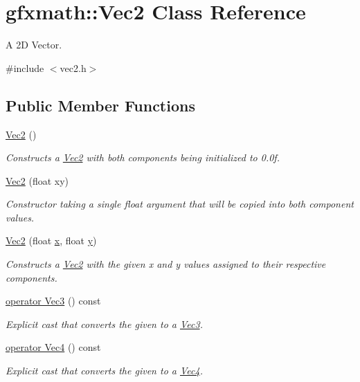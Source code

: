 \hypertarget{classgfxmath_1_1_vec2}{}\section{gfxmath\+:\+:Vec2 Class Reference}
\label{classgfxmath_1_1_vec2}


A 2\+D Vector.  




{\ttfamily \#include $<$vec2.\+h$>$}

\subsection*{Public Member Functions}
\begin{DoxyCompactItemize}
\item 
\hyperlink{classgfxmath_1_1_vec2_a6705094ec1164c6a52c1bbe9d94d9192}{Vec2} ()
\begin{DoxyCompactList}\small\item\em Constructs a \hyperlink{classgfxmath_1_1_vec2}{Vec2} with both components being initialized to 0.\+0f. \end{DoxyCompactList}\item 
\hyperlink{classgfxmath_1_1_vec2_ae02f434b2c19a96b3a4de04ab40d1926}{Vec2} (float xy)
\begin{DoxyCompactList}\small\item\em Constructor taking a single float argument that will be copied into both component values. \end{DoxyCompactList}\item 
\hyperlink{classgfxmath_1_1_vec2_a5d6593c89cfc3f5f0d0d11335363a50b}{Vec2} (float \hyperlink{classgfxmath_1_1_vec2_ae822579debf2a7b9aab468fbb4ce218d}{x}, float \hyperlink{classgfxmath_1_1_vec2_acfad5fd06cb37b0e0e5373f286e7d474}{y})
\begin{DoxyCompactList}\small\item\em Constructs a \hyperlink{classgfxmath_1_1_vec2}{Vec2} with the given x and y values assigned to their respective components. \end{DoxyCompactList}\item 
\hyperlink{classgfxmath_1_1_vec2_aa781cb14c428b5fbd4d0ba9e9434d726}{operator Vec3} () const 
\begin{DoxyCompactList}\small\item\em Explicit cast that converts the given to a \hyperlink{classgfxmath_1_1_vec3}{Vec3}. \end{DoxyCompactList}\item 
\hyperlink{classgfxmath_1_1_vec2_a4321b08d9298859824ac1cfcf44ab166}{operator Vec4} () const 
\begin{DoxyCompactList}\small\item\em Explicit cast that converts the given to a \hyperlink{classgfxmath_1_1_vec4}{Vec4}. \end{DoxyCompactList}\end{DoxyCompactItemize}
